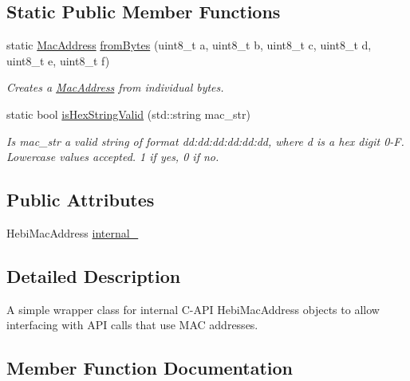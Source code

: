 \subsection*{Static Public Member Functions}
\begin{DoxyCompactItemize}
\item 
static \hyperlink{classhebi_1_1MacAddress}{Mac\+Address} \hyperlink{classhebi_1_1MacAddress_a478b629e48265e1a77afbc3feec03e35}{from\+Bytes} (uint8\+\_\+t a, uint8\+\_\+t b, uint8\+\_\+t c, uint8\+\_\+t d, uint8\+\_\+t e, uint8\+\_\+t f)\hypertarget{classhebi_1_1MacAddress_a478b629e48265e1a77afbc3feec03e35}{}\label{classhebi_1_1MacAddress_a478b629e48265e1a77afbc3feec03e35}

\begin{DoxyCompactList}\small\item\em Creates a \hyperlink{classhebi_1_1MacAddress}{Mac\+Address} from individual bytes. \end{DoxyCompactList}\item 
static bool \hyperlink{classhebi_1_1MacAddress_a3ac1c53a3f850f0228788d93482dcb57}{is\+Hex\+String\+Valid} (std\+::string mac\+\_\+str)
\begin{DoxyCompactList}\small\item\em Is mac\+\_\+str a valid string of format dd\+:dd\+:dd\+:dd\+:dd\+:dd, where \textquotesingle{}d\textquotesingle{} is a hex digit 0-\/F. Lowercase values accepted. 1 if yes, 0 if no. \end{DoxyCompactList}\end{DoxyCompactItemize}
\subsection*{Public Attributes}
\begin{DoxyCompactItemize}
\item 
Hebi\+Mac\+Address \hyperlink{classhebi_1_1MacAddress_ad199d2d2ce7c50825f8d75ade88dd4e7}{internal\+\_\+}
\end{DoxyCompactItemize}


\subsection{Detailed Description}
A simple wrapper class for internal C-\/\+A\+PI Hebi\+Mac\+Address objects to allow interfacing with A\+PI calls that use M\+AC addresses. 

\subsection{Member Function Documentation}
